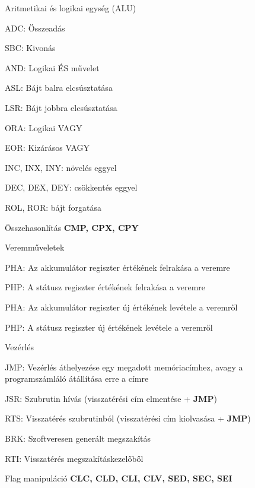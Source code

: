 \begin{compactdesc}
	\item Aritmetikai és logikai egység (ALU)
	\begin{compactdesc}
		\item[ADC:] Összeadás
		\item[SBC:] Kivonás
		\item[AND:] Logikai ÉS művelet
		\item[ASL:] Bájt balra elcsúsztatása
		\item[LSR:] Bájt jobbra elcsúsztatása
		\item[ORA:] Logikai VAGY
		\item[EOR:] Kizárásos VAGY
		\item[INC, INX, INY:] növelés eggyel
		\item[DEC, DEX, DEY:] csökkentés eggyel
		\item[ROL, ROR:] bájt forgatása
	\end{compactdesc}
	\item 
	Összehasonlítás \newline \textbf{CMP, CPX, CPY}
	\item Veremműveletek
	\begin{compactdesc}
		\item[PHA:] Az akkumulátor regiszter értékének felrakása a veremre 
		\item[PHP:] A státusz regiszter értékének felrakása a veremre
		\item[PHA:] Az akkumulátor regiszter új értékének levétele a veremről
		\item[PHP:] A státusz regiszter új értékének levétele a veremről
	\end{compactdesc}
	\item Vezérlés
	\begin{compactdesc}
		\item[JMP:] Vezérlés áthelyezése egy megadott memóriacímhez, avagy a programszámláló átállítása erre a címre
		\item[JSR:] Szubrutin hívás (visszatérési cím elmentése + \textbf{JMP})
		\item[RTS:] Visszatérés szubrutinból (visszatérési cím kiolvasása + \textbf{JMP})
		\item[BRK:] Szoftveresen generált megszakítás
		\item[RTI:] Visszatérés megszakításkezelőből
	\end{compactdesc}
	\item Flag manipuláció \newline \textbf{CLC, CLD, CLI, CLV, SED, SEC, SEI}

\end{compactdesc}
